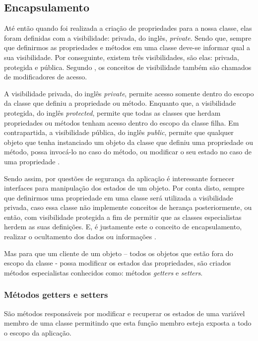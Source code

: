 \subsection{Encapsulamento}

Até então quando foi realizada a criação de propriedades para a nossa
classe, elas foram definidas com a visibilidade: privada, do inglês,
\textit{private}. Sendo que, sempre que definirmos as propriedades e métodos em
uma classe deve-se informar qual a  sua visibilidade. Por conseguinte, existem
três visibilidades, são elas: privada, protegida e pública. Segundo
, os conceitos de visibilidade também são
chamados de modificadores de acesso.

A visibilidade privada, do inglês \textit{private}, permite acesso somente
dentro do escopo da classe que definiu a propriedade ou método. Enquanto que, a
visibilidade protegida, do inglês \textit{protected}, permite que todas as
classes  que herdam propriedades ou métodos tenham acesso dentro do escopo da classe filha.
Em contrapartida, a visibilidade pública, do inglês \textit{public}, permite que
qualquer objeto que tenha instanciado um objeto da classe que definiu uma propriedade ou
método, possa invocá-lo no caso do método, ou modificar o seu estado no caso de
uma propriedade \cite{learningJava}.

Sendo assim, por questões de segurança da aplicação é interessante fornecer
interfaces para manipulação dos estados de um objeto. Por conta disto,  sempre
que definirmos uma propriedade em uma classe será utilizada a visibilidade
privada, caso essa classe não implemente conceitos de herança posteriormente,
ou então, com visibilidade protegida a fim de permitir que as classes
especialistas  herdem as suas definições. E, é justamente este o conceito de
encapsulamento, realizar o ocultamento dos dados ou informações \cite{javaComoProgramar}.

Mas para que um cliente de um objeto – todos os objetos que estão fora do
escopo da classe - possa modificar os estados das propriedades, são criados
métodos especialistas conhecidos como: métodos \textit{getters} e \textit{setters}.

\subsubsection{Métodos getters e setters}

São métodos responsáveis por modificar e recuperar os estados de uma variável
membro de uma classe permitindo que esta função membro esteja exposta a todo o
escopo da aplicação.

